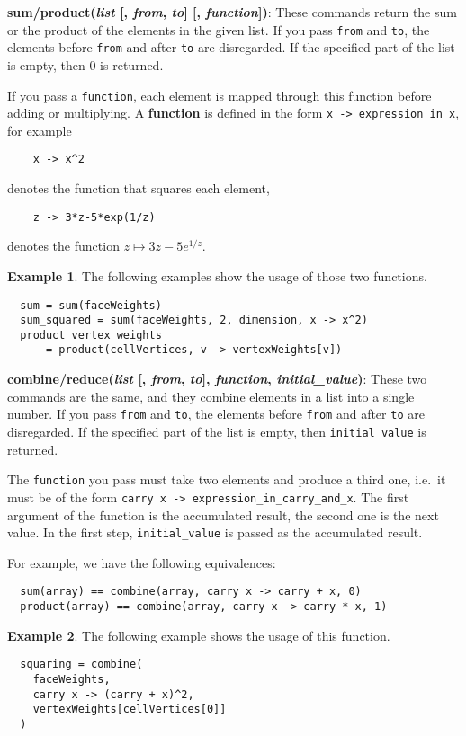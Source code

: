 \documentclass{amsart}
\theoremstyle{definition}
\newtheorem*{example*}{Example}
\begin{document}
\noindent
\textbf{sum/product(\textit{list} [, \textit{from}, \textit{to}] [, \textit{function}])}:
These commands return the sum or the product of the elements in the given list.
If you pass \texttt{from} and \texttt{to}, the elements before \texttt{from} and after \texttt{to}
are disregarded.
If the specified part of the list is empty, then 0 is returned.

If you pass a \texttt{function}, each element is mapped through this function before adding or
multiplying.
A \textbf{function} is defined in the form \verb+x -> expression_in_x+, for example
\begin{verbatim}
    x -> x^2
\end{verbatim}
denotes the function that squares each element,
\begin{verbatim}
    z -> 3*z-5*exp(1/z)
\end{verbatim}
denotes the function $z\mapsto 3z-5e^{1/z}$.
\begin{example*}
  The following examples show the usage of those two functions.
  \begin{verbatim}
  sum = sum(faceWeights)
  sum_squared = sum(faceWeights, 2, dimension, x -> x^2)
  product_vertex_weights
      = product(cellVertices, v -> vertexWeights[v])
  \end{verbatim}
\end{example*}

\noindent
\textbf{combine/reduce(\textit{list} [, \textit{from}, \textit{to}], \textit{function},
\textit{initial\_value})}:
These two commands are the same, and they combine elements in a list into a single number.
If you pass \texttt{from} and \texttt{to}, the elements before \texttt{from} and after \texttt{to}
are disregarded.
If the specified part of the list is empty, then \texttt{initial\_value} is returned.

The \texttt{function} you pass must take two elements and produce a third one, i.e.\ it must be of
the form \verb+carry x -> expression_in_carry_and_x+.
The first argument of the function is the accumulated result, the second one is the next value.
In the first step, \texttt{initial\_value} is passed as the accumulated result.

For example, we have the following equivalences:
\begin{verbatim}
  sum(array) == combine(array, carry x -> carry + x, 0)
  product(array) == combine(array, carry x -> carry * x, 1)
\end{verbatim}

\begin{example*}
  The following example shows the usage of this function.
  \begin{verbatim}
  squaring = combine(
    faceWeights,
    carry x -> (carry + x)^2,
    vertexWeights[cellVertices[0]]
  )
  \end{verbatim}
\end{example*}

\vfill
\end{document}
